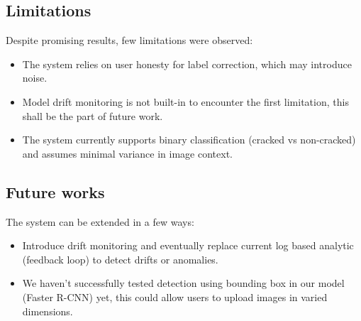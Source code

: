 \subsection{Limitations}

Despite promising results, few limitations were observed:

\begin{itemize}
	\item The system relies on user honesty for label correction, which may introduce noise.
	\item Model drift monitoring is not built-in to encounter the first limitation, this shall be the part of future work.
	\item The system currently supports binary classification (cracked vs non-cracked) and assumes minimal variance in image context.
\end{itemize}

\subsection{Future works}

The system can be extended in a few ways:

\begin{itemize}
	\item Introduce drift monitoring and eventually replace current log based analytic (feedback loop) to detect drifts or anomalies.
	\item We haven't successfully tested detection using bounding box in our model (Faster R-CNN) yet, this could allow users to upload images in varied dimensions.
\end{itemize}

\clearpage